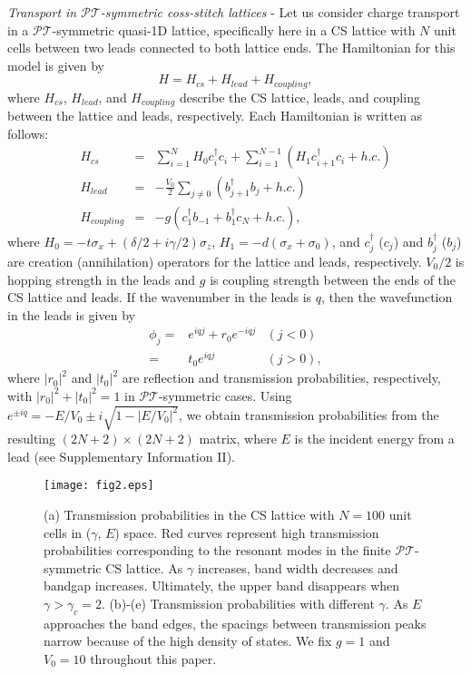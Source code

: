 \documentclass[report,epsfig,pre]{revtex4}
\begin{document}
{\it Transport in $\mathcal{PT}$-symmetric coss-stitch lattices} - 
Let us consider charge transport in a $\mathcal{PT}$-symmetric quasi-1D lattice, specifically here in a CS lattice with $N$ unit cells between two leads connected to both lattice ends. The Hamiltonian for this model is given by
\begin{equation}
 H = H_{cs} + H_{lead} + H_{coupling},
\label{fb_trans}
\end{equation}
where $H_{cs}$, $H_{lead}$, and $H_{coupling}$ describe the CS lattice, leads, and coupling between the lattice and leads, respectively. Each Hamiltonian is written as follows:
\begin{eqnarray}
 H_{cs} &=& \sum_{i=1}^{N}H_0 c_{i}^{\dagger} c_{i} + \sum_{i=1}^{N-1} (H_{1} c_{i+1}^{\dagger} c_{i} + h.c.) \\
 H_{lead} &=& -\frac{V_0}{2} \sum_{j \neq 0} (b_{j+1}^{\dagger} b_{j} + h.c.) \\
 H_{coupling} &=& -g ( c_{1}^{\dagger} b_{-1} + b_{1}^{\dagger} c_{N} + h.c.),
\end{eqnarray}
where $H_0 = -t \sigma_x + (\delta/2 + i \gamma/2) \sigma_z$, $H_1 = - d (\sigma_x + \sigma_0)$, and $c_{j}^{\dagger}$ ($c_{j}$) and $b_{j}^{\dagger}$ ($b_{j}$) are creation (annihilation) operators for the lattice and leads, respectively. $V_0 / 2$ is hopping strength in the leads and $g$ is coupling strength between the ends of the CS lattice and leads.
If the wavenumber in the leads is $q$, then the wavefunction in the leads is given by
\begin{eqnarray}
 \phi_{j} =& e^{i q j} + r_0 e^{-i q j} & (j < 0) \\
          =& t_0 e^{i q j} & (j > 0),
\end{eqnarray}
where $\left|r_0\right|^2$ and $\left|t_0\right|^2$ are reflection and transmission probabilities, respectively, with $\left|r_0\right|^2 + \left|t_0\right|^2 = 1$ in $\mathcal{PT}$-symmetric cases.
Using $e^{\pm i q} = - E/V_{0} \pm i \sqrt{1 - \left|E/V_{0}\right|^2}$, we obtain transmission probabilities from the resulting $(2N+2) \times (2N+2)$ matrix, where $E$ is the incident energy from a lead \cite{hee} (see Supplementary Information II).


\begin{figure}
\centering
\texttt{[image: fig2.eps]}
\caption{(a) Transmission probabilities in the CS lattice with $N=100$ unit cells in ($\gamma$, $E$) space.
Red curves represent high transmission probabilities corresponding to the resonant modes in the finite $\mathcal{PT}$-symmetric CS lattice. 
As $\gamma$ increases, band width decreases and bandgap increases. Ultimately, the upper band disappears when $\gamma > \gamma_c = 2$. 
(b)-(e) Transmission probabilities with different $\gamma$. As $E$ approaches the band edges, the spacings between transmission peaks narrow because of the high density of states. We fix $g=1$ and $V_0 = 10$ throughout this paper.
}
\label{fig2}
\end{figure}
\end{document}
